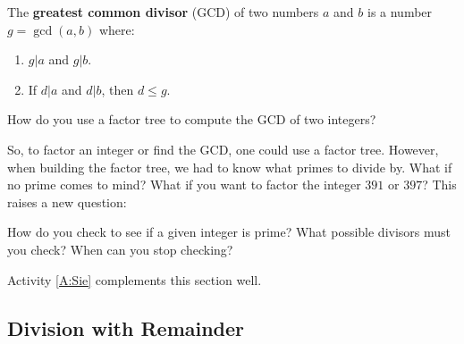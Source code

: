 \begin{definition} 
The \textbf{greatest common divisor} (GCD) of two numbers $a$ and $b$
is a number $g = \gcd(a,b)$ where:
\begin{enumerate}
\item $g|a$ and $g|b$.
\item If $d|a$ and $d|b$, then $d \le g$.
\end{enumerate}
\end{definition}

\begin{question}
How do you use a factor tree to compute the GCD of two integers?
\end{question}
\QM



So, to factor an integer or find the GCD, one could use a factor
tree. However, when building the factor tree, we had to know what
primes to divide by. What if no prime comes to mind? What if you want
to factor the integer $391$ or $397$? This raises a new question:

\begin{question} 
How do you check to see if a given integer is prime? What possible
divisors must you check? When can you stop checking?
\end{question}
\QM


\begin{activitynote}
Activity \ref{A:Sie} complements this section well. %
\end{activitynote}









\subsection{Division with Remainder}


